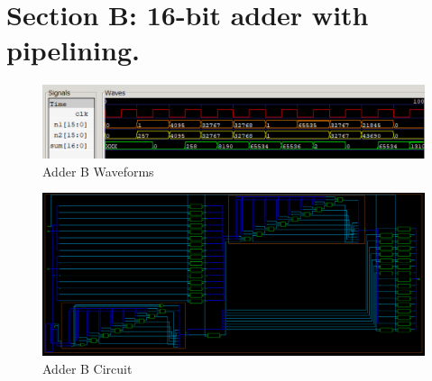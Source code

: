 \documentclass{article}
\begin{document}
\clearpage

\section*{Section B: 16-bit adder with pipelining.}





\begin{figure}[!ht] 
    \centering
    \includegraphics*[width = 15.1cm]{adder_b.png}
    \caption{Adder B Waveforms}
    \label{fig:bwaves}
\end{figure}    


\begin{figure}[!ht] 
    \centering
    \includegraphics*[width = 15.1cm]{adder_b_circuit.png}
    \caption{Adder B Circuit}
    \label{fig:bcircuit}
\end{figure}    
\end{document}
